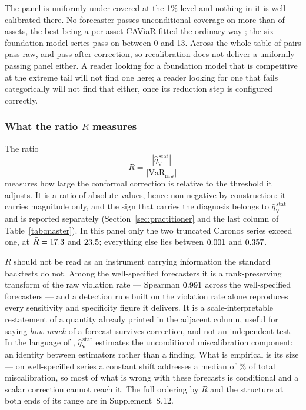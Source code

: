 \documentclass[preprint,11pt,authoryear]{elsarticle}
\newcommand{\VaR}{\mathrm{VaR}}
\newcommand{\1}{\boldsymbol{1}}
\newcommand{\qVstat}{\hat{q}_{\scriptscriptstyle\mathrm{V}}^{\,\mathrm{stat}}}
\begin{document}
The panel is uniformly under-covered at the 1\% level and nothing in it is well
calibrated there. No forecaster passes unconditional coverage on more than
\nMainBestKupiec{} of \nMainAssets{} assets, the best being a per-asset CAViaR
fitted the ordinary way \citep{engle2004caviar}; the six foundation-model series
pass on between 0 and 13. Across the whole table \nMainKupiecRawPasses{} of
\nMainPairs{} pairs pass raw, and \nMainKupiecCorPasses{} pass after correction,
so recalibration does not deliver a uniformly passing panel either. A reader
looking for a foundation model that is competitive at the extreme tail will not
find one here; a reader looking for one that fails categorically will not find
that either, once its reduction step is configured correctly.

\subsubsection{\texorpdfstring{What the ratio $R$ measures}{What the ratio R measures}}
\label{sec:R_meaning}

The ratio
\begin{equation}
	\label{eq:replacement_ratio}
	R = \frac{|\qVstat|}{|\VaR_{\mathrm{raw}}|}
\end{equation}
measures how large the conformal correction is relative to the threshold it
adjusts. It is a ratio of absolute values, hence non-negative by construction: it
carries magnitude only, and the sign that carries the diagnosis belongs to
$\qVstat$ and is reported separately (Section~\ref{sec:practitioner} and the last
column of Table~\ref{tab:master}). In this panel only the two truncated Chronos
series exceed one, at $\bar R = 17.3$ and $23.5$;
everything else lies between $0.001$ and $0.357$.

$R$ should not be read as an instrument carrying information the standard
backtests do not. Among the well-specified forecasters it is a rank-preserving
transform of the raw violation rate --- Spearman $0.991$ across the
\nSpearmanRPiN{} well-specified forecasters --- and a detection rule built on the
violation rate alone reproduces every sensitivity and specificity figure it
delivers. It is a scale-interpretable restatement of a quantity already printed
in the adjacent column, useful for saying \emph{how much} of a forecast survives
correction, and not an independent test. In the language of
\citet{gneiting2023regression}, $\qVstat$ estimates the unconditional
miscalibration component: an identity between estimators rather than a finding.
What is empirical is its size --- on well-specified series a constant shift
addresses a median of \nuMCBSharePct\% of total miscalibration, so most of what
is wrong with these forecasts is conditional and a scalar correction cannot reach
it. The full ordering by $\bar R$ and the structure at both ends of its range are
in Supplement~S.12.
\end{document}
